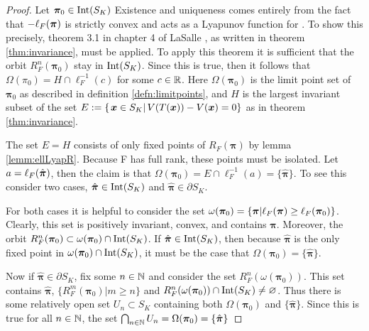 \begin{proof}
	Let \( \bm\pi_0\in\op{Int}(S_K)  \)
	Existence and uniqueness comes entirely from the fact that \( -\elpi{F} \) is strictly convex and acts as a Lyapunov function for . To show this precisely, theorem 3.1 in chapter 4 of LaSalle \cite{lasalle1976dynsys}, as written in theorem \ref{thm:invariance}, must be applied. To apply this theorem it is sufficient that the orbit \( R_F^n(\bm\pi_0) \) stay in \(\op{Int}(S_K)\). Since this is true, then it follows that \( \Omega(\pi_0) = H\cap \ell_{F}^{-1}(c) \) for some \( c\in \R \).	Here \( \Omega(\bm\pi_0) \) is the limit point set of \( \bm\pi_0 \) as described in definition \ref{defn:limitpoints}, and \( H \) is the largest invariant subset of the set \(E\defined\{\left.\bm x\in S_K\right|V(T(\bm x))-V(\bm x)=0\}\) as in theorem \ref{thm:invariance}. %
	
	The set \( E=H \) consists of only fixed points of \( R_{F}(\bm\pi) \) by lemma \ref{lemm:ellLyapR}. Because F has full rank, these points must be isolated. Let \( a=\elpi[\hat{\bm \pi}]{F} \), then the claim is that \( \Omega(\bm\pi_0) =E\cap\ell_{F}^{-1}(a)= \{\hat{\bm\pi}\}. \) To see this consider two cases, \( \hat{\bm \pi}\in \op{Int}(S_K) \) and \( \hat{\bm \pi}\in \partial S_K \). 
	
    For both cases it is helpful to consider the set \(\omega(\bm\pi_0) = \{\bm\pi|\elpi{F}\geq\ell_{F}(\bm\pi_0)\}\). Clearly, this set is positively invariant, convex, and contains \( \hat{\bm \pi}. \)  Moreover, the orbit \( R_F^n(\bm\pi_0) \subset \omega(\bm\pi_0)\cap \op{Int}(S_K)\). If \( \hat{\bm \pi}\in \op{Int}(S_K) \), then because \( \hat{\bm\pi} \)  is the only fixed point in \( \omega(\bm\pi_0)\cap \op{Int}(S_K) \), it must be the case that \( \Omega(\bm\pi_0) = \{\hat{\bm\pi}\} \).
    
    Now if \( \hat{\bm \pi}\in \partial S_K \), fix some \( n\in\N \) and consider the set \( R_F^n(\omega(\bm\pi_0)). \) This set contains \( \hat{\bm \pi} \), \( \{R_F^m(\bm\pi_0)|m\geq n\} \) and \( R_F^n(\omega(\bm\pi_0))\cap\op{Int}(S_K)\neq\varnothing \). Thus there is some relatively open set \( U_n \subset S_K\) containing both \( \Omega(\bm\pi_0) \) and \( \{\hat{\bm\pi}\} \). Since this is true for all \( n\in\N \), the set \( \bigcap_{n\in\N}U_n = \Omega(\bm\pi_0)=\{\hat{\bm\pi}\} \)	
\end{proof}

